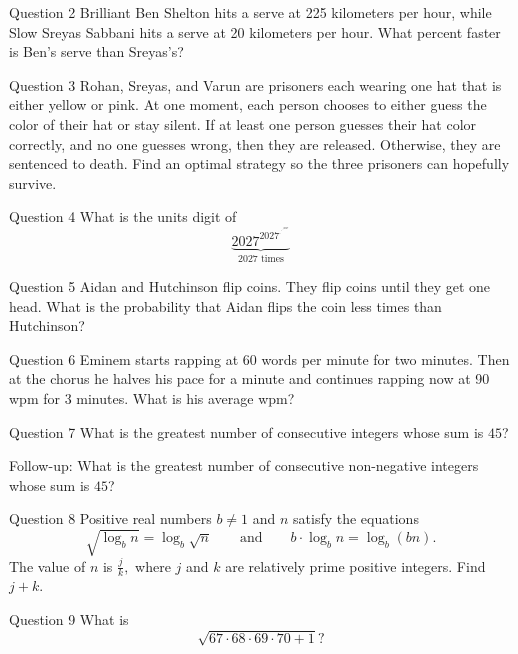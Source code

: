 \documentclass[aspectratio=169,xcolor=dvipsnames]{beamer}
\begin{document}
\begin{frame}[t]{Question 2}
    Brilliant Ben Shelton hits a serve at 225 kilometers per hour, while  Slow Sreyas Sabbani hits a serve at 20 kilometers per hour. What percent faster is Ben’s serve than Sreyas’s?
\end{frame}
 
\begin{frame}[t]{Question 3}
     Rohan, Sreyas, and Varun are prisoners each wearing one hat that is either yellow or pink. At one moment, each person chooses to either guess the color of their hat or stay silent. If at least one person guesses their hat color correctly, and no one guesses wrong, then they are released. Otherwise, they are sentenced to death. Find an optimal strategy so the three prisoners can hopefully survive.
\end{frame}

\begin{frame}[t]{Question 4}
    What is the units digit of \[ \underbrace{2027^{2027^{\cdot^{\cdot^{\cdot^{2027}}}}}}_{\text{2027 times}}\]
\end{frame}

\begin{frame}[t]{Question 5}
    Aidan and Hutchinson flip coins. They flip coins until they get one head. What is the probability that Aidan flips the coin less times than Hutchinson?
\end{frame}

\begin{frame}[t]{Question 6}
    Eminem starts rapping at 60 words per minute for two minutes. Then at the chorus he halves his pace for a minute and continues rapping now at 90 wpm for 3 minutes. What is his average wpm?
\end{frame}

\begin{frame}[t]{Question 7}
    What is the greatest number of consecutive integers whose sum is $45$?

    \vspace{3cm}
    
    Follow-up: What is the greatest number of consecutive non-negative integers whose sum is $45$?
\end{frame}

\begin{frame}[t]{Question 8}
    Positive real numbers $b \not= 1$ and $n$ satisfy the equations\[\sqrt{\log_b n} = \log_b \sqrt{n} \qquad \text{and} \qquad b \cdot \log_b n = \log_b (bn).\]The value of $n$ is $\frac{j}{k},$ where $j$ and $k$ are relatively prime positive integers. Find $j+k.$
\end{frame}
\begin{frame}[t]{Question 9}
    What is 
    \[
    \sqrt{67\cdot 68\cdot 69\cdot 70 +1}?
    \]
\end{frame}
\end{document}
